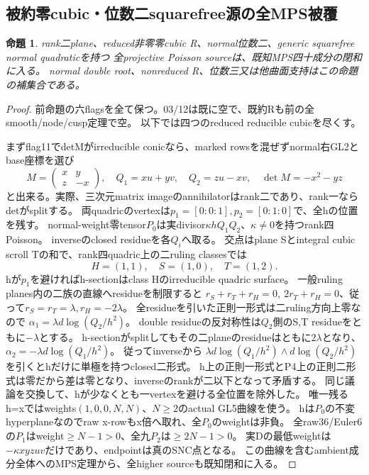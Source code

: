 \documentclass[a4paper,11pt]{ltjsarticle}
\newtheorem{proposition}{命題}[section]
\theoremstyle{definition}
\begin{document}
\subsection{被約零cubic・位数二squarefree源の全MPS被覆}
\begin{proposition}\label{prop:plane-m2-squarefree-reduced-all-MPS}
rank二plane、reduced非零零cubic R、normal位数二、generic squarefree normal quadraticを持つ
全projective Poisson sourceは、既知MPS四十成分の閉和に入る。
normal double root、nonreduced R、位数三又は他曲面支持はこの命題の補集合である。
\end{proposition}
\begin{proof}
前命題の六flagsを全て保つ。03/12は既に空で、既約Rも前の全smooth/node/cusp定理で空。
以下では四つのreduced reducible cubicを尽くす。

まずflag11でdetMがirreducible conicなら、marked rowsを混ぜずnormal右GL2とbase座標を選び
\[
 M=\begin{pmatrix}x&y\\z&-x\end{pmatrix},\quad
 Q_1=xu+yv,\quad Q_2=zu-xv,\quad\det M=-x^2-yz
\]
と出来る。実際、三次元matrix imageのannihilatorはrank二であり、rank一ならdetがsplitする。
両quadricのvertexは$p_1=[0:0:1],p_2=[0:1:0]$で、全hの位置を残す。
normal-weight零tensor$P_0$は実divisor$\kappa hQ_1Q_2$、$\kappa\ne0$を持つrank四Poisson。
inverseのclosed residueを各$Q_i$へ取る。
交点はplane Sとintegral cubic scroll Tの和で、rank四quadric上の二ruling classesでは
\[
 H=(1,1),\quad S=(1,0),\quad T=(1,2).
\]
hが$p_1$を避ければh-sectionはclass Hのirreducible quadric surface。
一般ruling planes内の二族の直線へresidueを制限すると
$r_S+r_T+r_H=0,\ 2r_T+r_H=0$、従って$r_S=r_T=\lambda,r_H=-2\lambda$。
全residueを引いた正則一形式は二ruling方向上零なので
$\alpha_1=\lambda d\log(Q_2/h^2)$。
double residueの反対称性は$Q_2$側のS,T residueをともに$-\lambda$とする。
h-sectionがsplitしてもその二planeのresidueはともに$2\lambda$となり、
$\alpha_2=-\lambda d\log(Q_1/h^2)$。
従ってinverseから
$\lambda d\log(Q_1/h^2)\wedge d\log(Q_2/h^2)$を引くとhだけに単極を持つclosed二形式。
h上の正則一形式とP4上の正則二形式は零だから差は零となり、inverseのrankが二以下となって矛盾する。
同じ議論を交換して、hが少なくとも一vertexを避ける全位置を除外した。
唯一残るh=xではweights$(1,0,0,N,N)$、$N\ge2$のactual GL5曲線を使う。
hは$P_0$の不変hyperplaneなのでraw x-rowもx倍へ取れ、全$P_0$のweightは非負。
全raw36/Euler6の$P_1$はweight$\ge N-1>0$、全九$P_2$は$\ge2N-1>0$。
実Dの最低weightは$-\kappa xyzuv$だけであり、endpointは真のSNC点となる。
この曲線を含むambient成分全体へのMPS定理から、全higher sourceも既知閉和に入る。


\end{proof}
\end{document}
